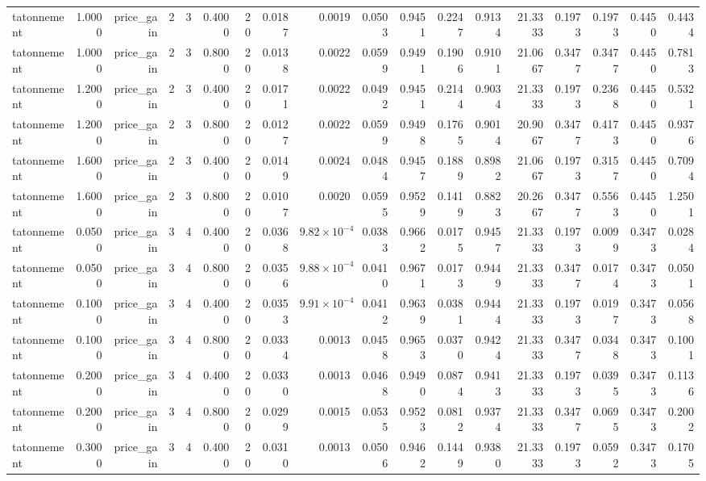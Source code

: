 \begin{table}[htbp]
\begin{tabular}{lrrrrrrrrrrrrrrrrr}
tatonnement & 1.0000 & price\_gain & 2 & 3 & 0.4000 & 20 & 0.0187 & 0.0019 & 0.0503 & 0.9451 & 0.2247 & 0.9134 & 21.3333 & 0.1973 & 0.1973 & 0.4450 & 0.4434 \\
tatonnement & 1.0000 & price\_gain & 2 & 3 & 0.8000 & 20 & 0.0138 & 0.0022 & 0.0599 & 0.9491 & 0.1906 & 0.9101 & 21.0667 & 0.3477 & 0.3477 & 0.4450 & 0.7813 \\
tatonnement & 1.2000 & price\_gain & 2 & 3 & 0.4000 & 20 & 0.0171 & 0.0022 & 0.0492 & 0.9451 & 0.2144 & 0.9034 & 21.3333 & 0.1973 & 0.2368 & 0.4450 & 0.5321 \\
tatonnement & 1.2000 & price\_gain & 2 & 3 & 0.8000 & 20 & 0.0127 & 0.0022 & 0.0599 & 0.9498 & 0.1765 & 0.9014 & 20.9067 & 0.3477 & 0.4173 & 0.4450 & 0.9376 \\
tatonnement & 1.6000 & price\_gain & 2 & 3 & 0.4000 & 20 & 0.0149 & 0.0024 & 0.0484 & 0.9457 & 0.1889 & 0.8982 & 21.0667 & 0.1973 & 0.3157 & 0.4450 & 0.7094 \\
tatonnement & 1.6000 & price\_gain & 2 & 3 & 0.8000 & 20 & 0.0107 & 0.0020 & 0.0595 & 0.9529 & 0.1419 & 0.8823 & 20.2667 & 0.3477 & 0.5563 & 0.4450 & 1.2501 \\
tatonnement & 0.0500 & price\_gain & 3 & 4 & 0.4000 & 20 & 0.0368 & $9.82\times10^{-4}$ & 0.0383 & 0.9662 & 0.0175 & 0.9457 & 21.3333 & 0.1973 & 0.0099 & 0.3473 & 0.0284 \\
tatonnement & 0.0500 & price\_gain & 3 & 4 & 0.8000 & 20 & 0.0356 & $9.88\times10^{-4}$ & 0.0410 & 0.9671 & 0.0173 & 0.9449 & 21.3333 & 0.3477 & 0.0174 & 0.3473 & 0.0501 \\
tatonnement & 0.1000 & price\_gain & 3 & 4 & 0.4000 & 20 & 0.0353 & $9.91\times10^{-4}$ & 0.0412 & 0.9639 & 0.0381 & 0.9444 & 21.3333 & 0.1973 & 0.0197 & 0.3473 & 0.0568 \\
tatonnement & 0.1000 & price\_gain & 3 & 4 & 0.8000 & 20 & 0.0334 & 0.0013 & 0.0458 & 0.9653 & 0.0370 & 0.9424 & 21.3333 & 0.3477 & 0.0348 & 0.3473 & 0.1001 \\
tatonnement & 0.2000 & price\_gain & 3 & 4 & 0.4000 & 20 & 0.0330 & 0.0013 & 0.0468 & 0.9490 & 0.0874 & 0.9413 & 21.3333 & 0.1973 & 0.0395 & 0.3473 & 0.1136 \\
tatonnement & 0.2000 & price\_gain & 3 & 4 & 0.8000 & 20 & 0.0299 & 0.0015 & 0.0535 & 0.9523 & 0.0812 & 0.9374 & 21.3333 & 0.3477 & 0.0695 & 0.3473 & 0.2002 \\
tatonnement & 0.3000 & price\_gain & 3 & 4 & 0.4000 & 20 & 0.0310 & 0.0013 & 0.0506 & 0.9462 & 0.1449 & 0.9380 & 21.3333 & 0.1973 & 0.0592 & 0.3473 & 0.1705 \\

\end{tabular}
\end{table}
